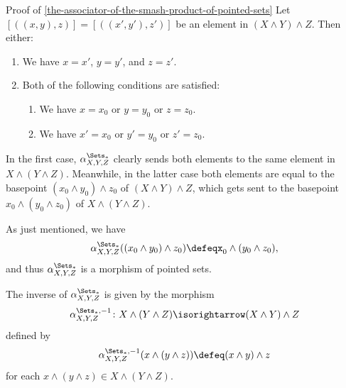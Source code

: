 \begin{Proof}{Proof of \cref{the-associator-of-the-smash-product-of-pointed-sets}}%
    Let $[((x,y),z)]=[((x',y'),z')]$ be an element in $(X\wedge Y)\wedge Z$. Then either:
    \begin{enumerate}
        \item\label{proof-of-the-associator-of-the-smash-product-of-pointed-sets-1}We have $x=x'$, $y=y'$, and $z=z'$.
        \item\label{proof-of-the-associator-of-the-smash-product-of-pointed-sets-2}Both of the following conditions are satisfied:
            \begin{enumerate}
                \item\label{proof-of-the-associator-of-the-smash-product-of-pointed-sets-2-a}We have $x=x_{0}$ or $y=y_{0}$ or $z=z_{0}$.
                \item\label{proof-of-the-associator-of-the-smash-product-of-pointed-sets-2-b}We have $x'=x_{0}$ or $y'=y_{0}$ or $z'=z_{0}$.
            \end{enumerate}
    \end{enumerate}
    In the first case, $\alpha^{\Sets_{*}}_{X,Y,Z}$ clearly sends both elements to the same element in $X\wedge(Y\wedge Z)$. Meanwhile, in the latter case both elements are equal to the basepoint $(x_{0}\wedge y_{0})\wedge z_{0}$ of $(X\wedge Y)\wedge Z$, which gets sent to the basepoint $x_{0}\wedge(y_{0}\wedge z_{0})$ of $X\wedge(Y\wedge Z)$.

    As just mentioned, we have
    \[
        \alpha^{\Sets_{*}}_{X,Y,Z}((x_{0}\wedge y_{0})\wedge z_{0})%
        \defeq%
        x_{0}\wedge(y_{0}\wedge z_{0}),%
    \]%
    and thus $\alpha^{\Sets_{*}}_{X,Y,Z}$ is a morphism of pointed sets.

    The inverse of $\alpha^{\Sets_{*}}_{X,Y,Z}$ is given by the morphism
    \[
        \alpha^{\Sets_{*},-1}_{X,Y,Z}
        \colon
        X\wedge(Y\wedge Z)
        \isorightarrow
        (X\wedge Y)\wedge Z
    \]%
    defined by
    \[
        \alpha^{\Sets_{*},-1}_{X,Y,Z}(x\wedge(y\wedge z))%
        \defeq%
        (x\wedge y)\wedge z
    \]%
    for each $x\wedge(y\wedge z)\in X\wedge(Y\wedge Z)$.


\end{Proof}
